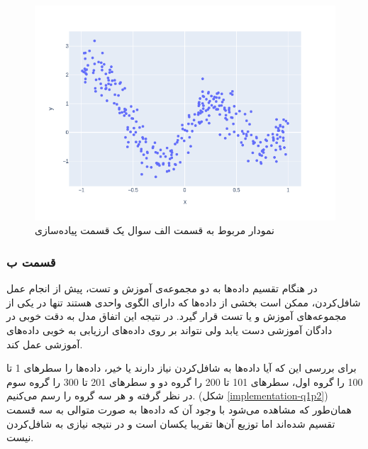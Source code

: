 \documentclass[14pt,a4]{article}
\begin{document}
\begin{figure}[h]
    \centering
    \includegraphics[width=\linewidth]{images/implementation/q1/p1.png}
    \caption{نمودار مربوط به قسمت الف سوال یک قسمت پیاده‌سازی}
    \label{implementation-q1p1}
\end{figure}

\subsubsection*{قسمت ب}

در هنگام تقسیم داده‌ها به دو مجموعه‌ی آموزش و تست، پیش از انجام عمل شافل‌کردن،
ممکن است بخشی از داده‌ها که دارای الگوی واحدی هستند تنها در یکی از مجموعه‌های آموزش و یا تست قرار گیرد.
در نتیجه این اتفاق مدل به دقت خوبی در دادگان آموزشی دست یابد ولی نتواند بر روی داده‌های ارزیابی
به خوبی داده‌های آموزشی عمل کند.

برای بررسی این که آیا داده‌ها به شافل‌کردن نیاز دارند یا خیر، داده‌ها را سطر‌های 1 تا 100 را گروه اول،
سطر‌های 101 تا 200 را گروه دو و سطر‌های 201 تا 300 را گروه سوم در نظر گرفته و هر سه گروه را رسم می‌کنیم.
(شکل \ref{implementation-q1p2}) همان‌طور که مشاهده می‌شود با وجود آن که داده‌ها
به صورت متوالی به سه قسمت تقسیم شده‌اند اما توزیع آن‌ها تقریبا یکسان است و در نتیجه نیازی به شافل‌کردن نیست.
\end{document}

